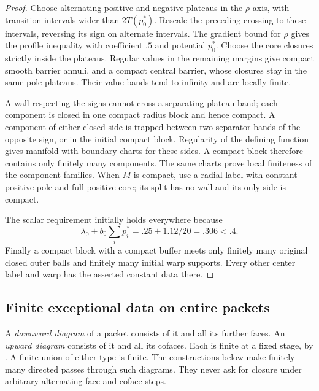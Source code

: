 \documentclass[11pt]{article}
\numberwithin{equation}{section}
\theoremstyle{definition}
\theoremstyle{remark}
\begin{document}
\begin{proof}
Choose alternating positive and negative plateaus in the $\rho$-axis,
with transition intervals wider than $2T(p_0^*)$. Rescale the preceding
crossing to these intervals, reversing its sign on alternate intervals.
The gradient bound for $\rho$ gives the profile inequality with
coefficient $.5$ and potential $p_0^*$. Choose the core closures
strictly inside the plateaus. Regular values in the remaining margins
give compact smooth barrier annuli, and a compact central barrier,
whose closures stay in the same pole plateaus. Their value bands tend
to infinity and are locally finite.

A wall respecting the signs cannot cross a separating plateau band;
each component is closed in one compact radius block and hence compact.
A component of either closed side is trapped between two separator
bands of the opposite sign, or in the initial compact block.
Regularity of the defining function gives manifold-with-boundary
charts for these sides. A compact block therefore contains only
finitely many components. The same charts prove local finiteness of
the component families. When $M$ is compact, use a radial label with
constant positive pole and full positive core; its split has no wall
and its only side is compact.

The scalar requirement initially holds everywhere because
\[
 \lambda_0+b_0\sum_i p_i^*=.25+1.12/20=.306<.4.
\]
Finally a compact block with a compact buffer meets only finitely many
original closed outer balls and finitely many initial warp supports.
Every other center label and warp has the asserted constant data there.
\end{proof}

\subsection{Finite exceptional data on entire packets}

A \emph{downward diagram} of a packet consists of it and all its further
faces. An \emph{upward diagram} consists of it and all its cofaces.
Each is finite at a fixed stage, by . A finite union
of either type is finite. The constructions below make finitely many
directed passes through such diagrams. They never ask for closure
under arbitrary alternating face and coface steps.
\end{document}
